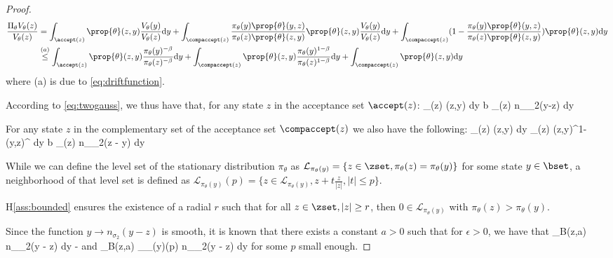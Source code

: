 \documentclass{article}
\begin{document}
\begin{proof}
\begin{align}\label{eq:main1}
 \frac{\Pi_\theta V_\theta(z)}{V_\theta(z)} & = \int_{\accept(z)}  \prop{\theta}(z,y) \frac{V_\theta(y)}{V_\theta(z)} \textrm{d}y +  \int_{\compaccept(z)} \frac{\pi_\theta(y)\prop{\theta}(y,z)}{\pi_\theta(z)\prop{\theta}(z,y)} \prop{\theta}(z,y) \frac{V_\theta(y)}{V_\theta(z)} \textrm{d}y +  \int_{\compaccept(z)} (1 - \frac{\pi_\theta(y)\prop{\theta}(y,z)}{\pi_\theta(z)\prop{\theta}(z,y)}) \prop{\theta}(z,y)  \textrm{d}y\\
 &  \overset{(a)}{\leq} \int_{\accept(z)}  \prop{\theta}(z,y) \frac{\pi_\theta(y)^{-\beta}}{\pi_\theta(z)^{-\beta}} \textrm{d}y  + \int_{\compaccept(z)} \prop{\theta}(z,y) \frac{\pi_\theta(y)^{1-\beta}}{\pi_\theta(z)^{1-\beta}}\textrm{d}y +  \int_{\compaccept(z)} \prop{\theta}(z,y)  \textrm{d}y
\end{align}
where (a) is due to \eqref{eq:driftfunction}.

According to \eqref{eq:twogauss}, we thus have that, for any state $z$ in the acceptance set $\accept(z)$:
\beq 
\int_{\accept(z)}  \prop{\theta}(z,y)  \textrm{d}y  \leq  b \int_{\accept(z)}  n_{\sigma_2}(y-z)  \textrm{d}y 
\eeq

For any state $z$ in the complementary set of the acceptance set $\compaccept(z)$ we also have the following:
\beq
\int_{\compaccept(z)} \prop{\theta}(z,y) \textrm{d}y \leq \int_{\compaccept(z)} \prop{\theta}(z,y)^{1- \beta} \prop{\theta}(y,z)^{\beta}  \textrm{d}y \leq b \int_{\compaccept(z)} n_{\sigma_2}(z - y)  \textrm{d}y
\eeq


While we can define the level set of the stationary distribution $\pi_\theta$ as $\mathcal{L}_{\pi_\theta(y)} = \{ z \in \zset, \pi_\theta(z) = \pi_\theta(y) \}$ for some state $y \in \bset$, a neighborhood of that level set is defined as $\mathcal{L}_{\pi_\theta(y)}(p) = \{z \in  \mathcal{L}_{\pi_\theta(y)}, z + t \frac{z}{|z|}, |t| \leq p \}$.

H\ref{ass:bounded} ensures the existence of a radial $r$ such that for all $z \in \zset, |z| \geq r$, then $0 \in \mathcal{L}_{\pi_\theta(y)}$ with $\pi_\theta(z) >  \pi_\theta(y)$.

Since the function $y \to n_{\sigma_2}(y - z)$ is smooth, it is known that there exists a constant $a >0$ such that for $\epsilon >0$, we have that 
\beq
\int_{B(z,a)}  n_{\sigma_2}(y - z) \textrm{d}y  - \epsilon \quad \textrm{and} \quad \int_{B(z,a) \cap {}_{\pi_\theta(y)}(p) }  n_{\sigma_2}(y - z) \textrm{d}y \leq  \epsilon
\eeq
for some $p$ small enough.

\end{proof}
\end{document}
